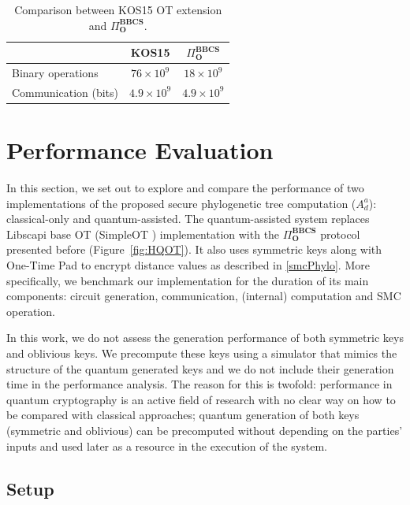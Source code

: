 \begin{table}[!h]
\centering
\begin{tabular}{lcc}
\toprule
 & KOS15 & $\Pi^{\textbf{BBCS}}_{\textbf{O}}$ \\
\midrule
\multicolumn{1}{l}{Binary operations} & $76\times 10^9$ & $18\times 10^9$ \\
\multicolumn{1}{l}{Communication (bits)} & $4.9\times 10^9$ & $4.9\times 10^9$ \\
\bottomrule
\end{tabular}
\caption{Comparison between KOS15 OT extension and $\Pi^{\textbf{BBCS}}_{\textbf{O}}$.}
\label{table:Com_Comp_complexity}
\end{table}



\section{Performance Evaluation}\label{perfEvaluation}

In this section, we set out to explore and compare the performance of two implementations of the proposed secure phylogenetic tree computation ($A^a_d$): classical-only and quantum-assisted. The quantum-assisted system replaces Libscapi base OT (SimpleOT \cite{C15}) implementation with the $\Pi^{\textbf{BBCS}}_{\textbf{O}}$ protocol presented before (Figure~\ref{fig:HQOT}). It also uses symmetric keys along with One-Time Pad to encrypt distance values as described in \ref{smcPhylo}. More specifically, we benchmark our implementation for the duration of its main components: circuit generation, communication, (internal) computation and SMC operation.

In this work, we do not assess the generation performance of both symmetric keys and oblivious keys. We precompute these keys using a simulator that mimics the structure of the quantum generated keys and we do not include their generation time in the performance analysis. The reason for this is twofold: performance in quantum cryptography is an active field of research with no clear way on how to be compared with classical approaches; quantum generation of both keys (symmetric and oblivious) can be precomputed without depending on the parties' inputs and used later as a resource in the execution of the system.

\subsection{Setup}

